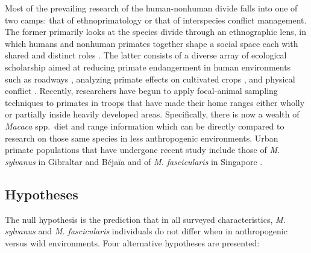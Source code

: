 \documentclass[american]{../../../coursework}
\begin{document}
Most of the prevailing research of the human-nonhuman divide falls into one of
two camps: that of ethnoprimatology or that of interspecies conflict
management. The former primarily looks at the species divide through an
ethnographic lens, in which humans and nonhuman primates together shape a
social space each with shared and distinct roles \parencite{Fue12,Ril13}. The
latter consists of a diverse array of ecological scholarship aimed at reducing
primate endangerment in human environments such as roadways \parencite{Lin16},
analyzing primate effects on cultivated crops \parencite{Hil17,Hoc17,McK15},
and physical conflict \parencite{Hof12}. Recently, researchers have begun to
apply focal-animal sampling techniques to primates in troops that have made
their home ranges either wholly or partially inside heavily developed areas.
Specifically, there is now a wealth of
\textit{Macaca} spp.\ diet and range information
which can be directly compared to research on those same species in less
anthropogenic environments. Urban primate populations that have undergone
recent study include those of \textit{M. sylvanus} in Gibraltar
\parencite{Ethnoprimatology6,Kle17} and Béjaïa \parencite{Mai15} and of
\textit{M. fascicularis} in Singapore \parencite{Kle17}.

\subsection{Hypotheses}

The null hypothesis is the prediction that in all surveyed characteristics,
\textit{M. sylvanus} and \textit{M. fascicularis} individuals do not differ
when in anthropogenic versus wild environments. Four alternative hypotheses
are presented:
\end{document}

